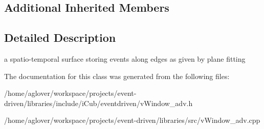 \subsection*{Additional Inherited Members}


\subsection{Detailed Description}
a spatio-\/temporal surface storing events along edges as given by plane fitting 

The documentation for this class was generated from the following files\+:\begin{DoxyCompactItemize}
\item 
/home/aglover/workspace/projects/event-\/driven/libraries/include/i\+Cub/eventdriven/v\+Window\+\_\+adv.\+h\item 
/home/aglover/workspace/projects/event-\/driven/libraries/src/v\+Window\+\_\+adv.\+cpp\end{DoxyCompactItemize}
